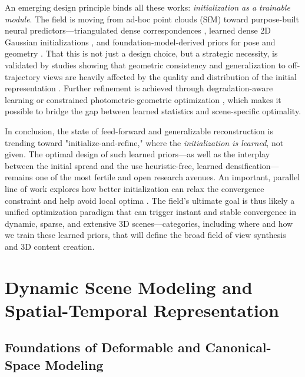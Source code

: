 \documentclass[11pt,a4paper]{article}
\begin{document}
An emerging design principle binds all these works: \emph{initialization as a trainable module}. The field is moving from ad-hoc point clouds (SfM) toward purpose-built neural predictors---triangulated dense correspondences \cite{arxiv:2504.13204v2}, learned dense 2D Gaussian initializations \cite{arxiv:2505.05591v2}, and foundation-model-derived priors for pose and geometry \cite{arxiv:2607.03209v1}. That this is not just a design choice, but a strategic necessity, is validated by studies showing that geometric consistency and generalization to off-trajectory views are heavily affected by the quality and distribution of the initial representation \cite{arxiv:2603.20714v3}. Further refinement is achieved through degradation-aware learning or constrained photometric-geometric optimization \cite{arxiv:2605.14880v1,arxiv:2504.09129v1}, which makes it possible to bridge the gap between learned statistics and scene-specific optimality.

In conclusion, the state of feed-forward and generalizable reconstruction is trending toward "initialize-and-refine," where the \emph{initialization is learned}, not given. The optimal design of such learned priors---as well as the interplay between the initial spread and the use heuristic-free, learned densification---remains one of the most fertile and open research avenues. An important, parallel line of work explores how better initialization can relax the convergence constraint and help avoid local optima \cite{arxiv:2403.09413v1,arxiv:2607.17965v1,arxiv:2509.11853v2}. The field's ultimate goal is thus likely a unified optimization paradigm that can trigger instant and stable convergence in dynamic, sparse, and extensive 3D scenes---categories, including where and how we train these learned priors, that will define the broad field of view synthesis and 3D content creation.


\section{Dynamic Scene Modeling and Spatial-Temporal Representation}



\subsection{Foundations of Deformable and Canonical-Space Modeling}
\end{document}
